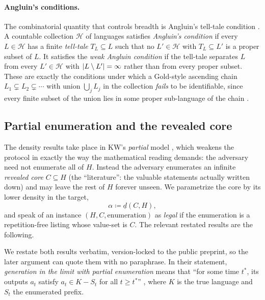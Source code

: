\documentclass[11pt]{article}
\numberwithin{equation}{section}
\newcommand{\mc}[1]{\mathcal{#1}}
\newcommand{\defeq}{\coloneqq}
\DeclarePairedDelimiter{\abs}{\lvert}{\rvert}
\newcommand{\Val}{H}
\newcommand{\Hcal}{\mc{H}}
\newcommand{\Core}{C}
\newcommand{\dlow}[2]{\underline{d}(#1,#2)}
\theoremstyle{plain}
\theoremstyle{definition}
\theoremstyle{remark}
\begin{document}
\paragraph{Angluin's conditions.}
The combinatorial quantity that controls breadth is Angluin's tell-tale condition
\citep{angluin1980inductive}. A countable collection $\Hcal$ of languages satisfies
\emph{Angluin's condition} if every $L \in \Hcal$ has a finite \emph{tell-tale} $T_L \subseteq
L$ such that no $L' \in \Hcal$ with $T_L \subseteq L'$ is a proper subset of $L$. It satisfies
the \emph{weak Angluin condition} if the tell-tale separates $L$ from every $L' \in \Hcal$
with $\abs{L \setminus L'} = \infty$ rather than from every proper subset. These are exactly
the conditions under which a Gold-style ascending chain $L_1 \subsetneq L_2 \subsetneq \cdots$
with union $\bigcup_j L_j$ in the collection \emph{fails} to be identifiable, since every
finite subset of the union lies in some proper sub-language of the chain
\citep{gold1967language}.

\subsection{Partial enumeration and the revealed core}
\label{sec:prelim-partial}

The density results take place in KW's \emph{partial} model \citep{kleinberg2026partial},
which weakens the protocol in exactly the way the mathematical reading demands: the adversary
need not enumerate all of $\Val$. Instead the adversary enumerates an infinite \emph{revealed
core} $\Core \subseteq \Val$ (the ``literature'': the valuable statements actually written
down) and may leave the rest of $\Val$ forever unseen. We parametrize the core by its lower
density in the target,
\begin{equation}\label{eq:alpha}
  \alpha \defeq \dlow{\Core}{\Val} ,
\end{equation}
and speak of an instance $(\Val, \Core, \text{enumeration})$ as \emph{legal} if the
enumeration is a repetition-free listing whose value-set is $\Core$. The relevant restated
results are the following.

We restate both results verbatim, version-locked to the public preprint, so the later argument
can quote them with no paraphrase. In their statement, \emph{generation in the limit with
partial enumeration} means that ``for some time $t^*$, its outputs $a_t$ satisfy $a_t \in K -
S_t$ for all $t \ge t^*$'' \citep[\S1]{kleinberg2026partial}, where $K$ is the true language
and $S_t$ the enumerated prefix.
\end{document}
